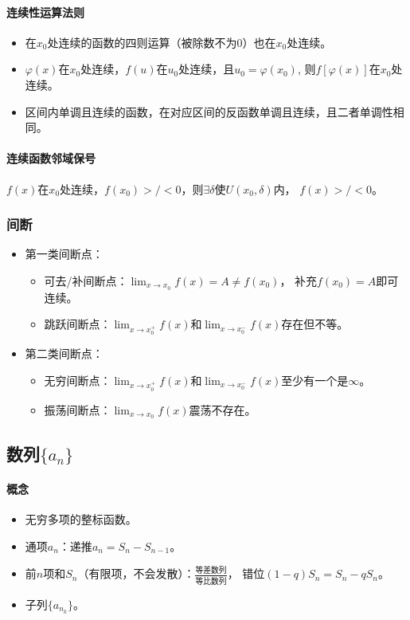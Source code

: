 \documentclass[
12pt, %
a4paper, 
oneside, %
headinclude,footinclude, %
]{scrartcl}
\begin{document}
\paragraph{连续性运算法则}
\begin{itemize}
\item 在$ x_0 $处连续的函数的四则运算（被除数不为$ 0 $）也在$ x_0 $处连续。
\item $ \varphi (x) $在$ x_0 $处连续，$ f(u) $在$ u_0 $处连续，且$ u_0 = \varphi (x_0) $,
则$ f[\varphi (x)] $在$ x_0 $处连续。
\item 区间内单调且连续的函数，在对应区间的反函数单调且连续，且二者单调性相同。
\end{itemize}
\paragraph{连续函数邻域保号}
$ f(x) $在$ x_0 $处连续，$ f(x_0) >/< 0 $，则$ \exists \delta $使$ U(x_0, \delta) $内，
$ f(x) >/< 0 $。
\subsubsection[间断]{间断}
\begin{itemize}
\item 第一类间断点：
\begin{itemize}
\item 可去/补间断点：$ \lim_{x \to x_0}f(x) = A \neq f(x_0) $，
补充$ f(x_0) = A $即可连续。
\item 跳跃间断点：$ \lim_{x \to x_0^+}f(x) $和$ \lim_{x \to x_0^-}f(x) $存在但不等。
\end{itemize}
\item 第二类间断点：
\begin{itemize}
\item 无穷间断点：$ \lim_{x \to x_0^+}f(x) $和$ \lim_{x \to x_0^-}f(x) $至少有一个是$ \infty $。
\item 振荡间断点：$ \lim_{x \to x_0}f(x) $震荡不存在。
\end{itemize}
\end{itemize}
\subsection[数列]{数列$ \{a_n\} $}
\paragraph{概念}
\begin{itemize}
\item 无穷多项的整标函数。
\item 通项$ a_n $：递推$ a_n = S_n - S_{n - 1} $。
\item 前$ n $项和$ S_n $（有限项，不会发散）：$ \frac{\text{等差数列}}{\text{等比数列}} $，
错位$ (1-q) S_n = S_n - q S_n $。
\item 子列$ \{a_{n_k}\} $。
\end{itemize}
\end{document}
